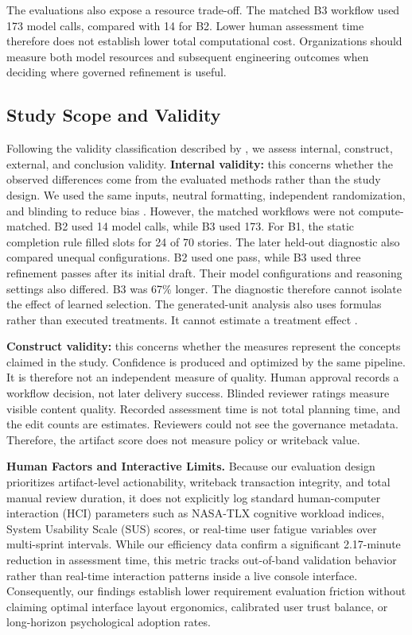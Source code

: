 \documentclass[pdflatex,sn-basic]{sn-jnl}
\begin{document}
The evaluations also expose a resource trade-off. The matched B3 workflow used 173 model calls, compared with 14 for B2. Lower human assessment time therefore does not establish lower total computational cost. Organizations should measure both model resources and subsequent engineering outcomes when deciding where governed refinement is useful.

\subsection{Study Scope and Validity}
Following the validity classification described by \citet{R55}, we assess internal, construct, external, and conclusion validity.
\textbf{Internal validity:} this concerns whether the observed differences come from the evaluated methods rather than the study design. We used the same inputs, neutral formatting, independent randomization, and blinding to reduce bias \citep{R55}. However, the matched workflows were not compute-matched. B2 used 14 model calls, while B3 used 173. For B1, the static completion rule filled slots for 24 of 70 stories. The later held-out diagnostic also compared unequal configurations. B2 used one pass, while B3 used three refinement passes after its initial draft. Their model configurations and reasoning settings also differed. B3 was 67\% longer. The diagnostic therefore cannot isolate the effect of learned selection. The generated-unit analysis also uses formulas rather than executed treatments. It cannot estimate a treatment effect \citep{R71}.

\textbf{Construct validity:} this concerns whether the measures represent the concepts claimed in the study. Confidence is produced and optimized by the same pipeline. It is therefore not an independent measure of quality. Human approval records a workflow decision, not later delivery success. Blinded reviewer ratings measure visible content quality. Recorded assessment time is not total planning time, and the edit counts are estimates. Reviewers could not see the governance metadata. Therefore, the artifact score does not measure policy or writeback value.

\noindent\textbf{Human Factors and Interactive Limits.} Because our evaluation design prioritizes artifact-level actionability, writeback transaction integrity, and total manual review duration, it does not explicitly log standard human-computer interaction (HCI) parameters such as NASA-TLX cognitive workload indices, System Usability Scale (SUS) scores, or real-time user fatigue variables over multi-sprint intervals. While our efficiency data confirm a significant 2.17-minute reduction in assessment time, this metric tracks out-of-band validation behavior rather than real-time interaction patterns inside a live console interface. Consequently, our findings establish lower requirement evaluation friction without claiming optimal interface layout ergonomics, calibrated user trust balance, or long-horizon psychological adoption rates.
\end{document}
